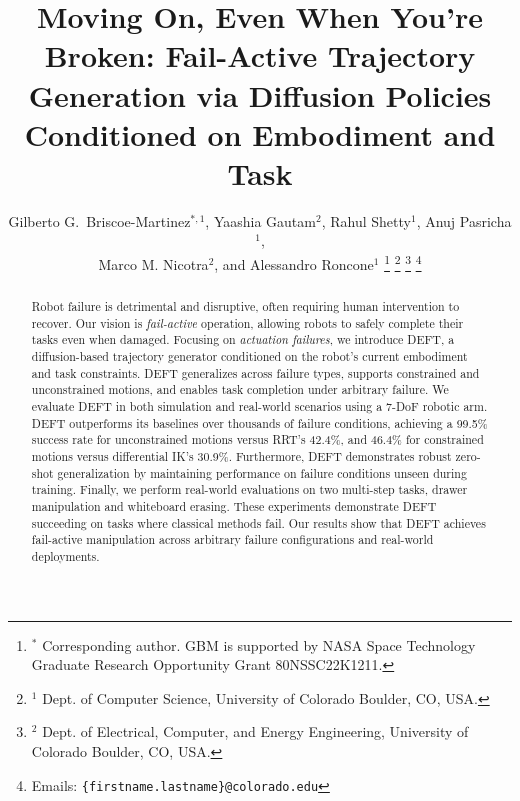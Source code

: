 \documentclass[letterpaper, 10 pt, conference]{ieeeconf}  %
\title{Moving On, Even When You're Broken: Fail-Active Trajectory Generation via Diffusion Policies Conditioned on Embodiment and Task \vspace{-10pt}}
\author{Gilberto G.~Briscoe-Martinez$^{*, 1}$, Yaashia Gautam$^{2}$, Rahul Shetty$^{1}$, Anuj Pasricha$^{1}$, \\ Marco M. Nicotra$^{2}$, and Alessandro Roncone$^{1}$\vspace{-10pt}%
\thanks{$^{*}$ Corresponding author. GBM is supported by NASA Space Technology Graduate Research Opportunity Grant 80NSSC22K1211.}%
\thanks{$^{1}$ Dept. of Computer Science, University of Colorado Boulder, CO, USA.}%
\thanks{$^{2}$ Dept. of Electrical, Computer, and Energy Engineering, University of Colorado Boulder, CO, USA.}%
\thanks{Emails: {\tt\small \{firstname.lastname\}@colorado.edu}}%
}
\newcommand{\gm}[1]{{\color{red}GM:#1} }
\begin{document}
\maketitle
\thispagestyle{empty}
\pagestyle{empty}

\begin{abstract}
Robot failure is detrimental and disruptive, often requiring human intervention to recover. Our vision is \textsl{fail-active} operation, allowing robots to safely complete their tasks even when damaged. Focusing on \textsl{actuation failures}, we introduce DEFT, a diffusion-based trajectory generator conditioned on the robot’s current embodiment and task constraints. DEFT generalizes across failure types, supports constrained and unconstrained motions, and enables task completion under arbitrary failure. We evaluate DEFT in both simulation and real-world scenarios using a 7-DoF robotic arm. DEFT outperforms its baselines over thousands of failure conditions, achieving a 99.5\% success rate for unconstrained motions versus RRT's 42.4\%, and 46.4\% for constrained motions versus differential IK's 30.9\%. Furthermore, DEFT demonstrates robust zero-shot generalization by maintaining performance on failure conditions unseen during training. Finally, we perform real-world evaluations on two multi-step tasks, drawer manipulation and whiteboard erasing. These experiments demonstrate DEFT succeeding on tasks where classical methods fail. Our results show that DEFT achieves fail-active manipulation across arbitrary failure configurations and real-world deployments.

\end{abstract}








% 

\AtNextBibliography{\small}
\printbibliography

\clearpage





% 
% 
\end{document}
